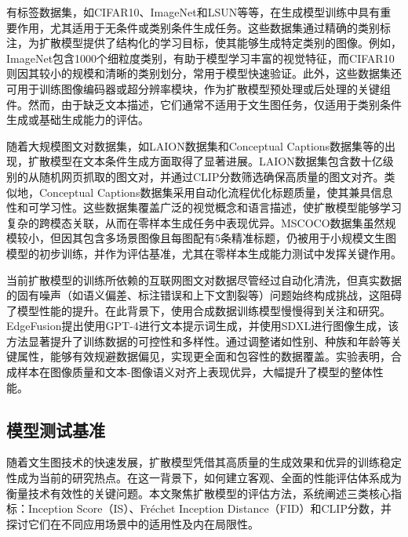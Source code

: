 \documentclass[11pt,a4paper,UTF8]{ctexart}
\begin{document}
有标签数据集，如CIFAR10\cite{krizhevsky2009learning}、ImageNet\cite{deng2009imagenet}和LSUN\cite{yu2015lsun}等等，在生成模型训练中具有重要作用，尤其适用于无条件或类别条件生成任务。这些数据集通过精确的类别标注，为扩散模型提供了结构化的学习目标，使其能够生成特定类别的图像。例如，ImageNet包含1000个细粒度类别，有助于模型学习丰富的视觉特征，而CIFAR10则因其较小的规模和清晰的类别划分，常用于模型快速验证。此外，这些数据集还可用于训练图像编码器或超分辨率模块\cite{rombach2022high}，作为扩散模型预处理或后处理的关键组件。然而，由于缺乏文本描述，它们通常不适用于文生图任务，仅适用于类别条件生成或基础生成能力的评估。

随着大规模图文对数据集，如LAION数据集\cite{schuhmann2021laion}和Conceptual Captions数据集\cite{sharma2018conceptual,changpinyo2021conceptual}等的出现，扩散模型在文本条件生成方面取得了显著进展。LAION数据集包含数十亿级别的从随机网页抓取的图文对，并通过CLIP分数筛选确保高质量的图文对齐。类似地，Conceptual Captions数据集采用自动化流程优化标题质量，使其兼具信息性和可学习性。这些数据集覆盖广泛的视觉概念和语言描述，使扩散模型能够学习复杂的跨模态关联，从而在零样本生成任务中表现优异。MSCOCO数据集\cite{lin2014microsoft}虽然规模较小，但因其包含多场景图像且每图配有5条精准标题，仍被用于小规模文生图模型的初步训练，并作为评估基准，尤其在零样本生成能力测试中发挥关键作用。

当前扩散模型的训练所依赖的互联网图文对数据尽管经过自动化清洗，但真实数据的固有噪声（如语义偏差、标注错误和上下文割裂等）问题始终构成挑战，这阻碍了模型性能的提升。在此背景下，使用合成数据训练模型慢慢得到关注和研究。EdgeFusion\cite{castells2024edgefusion}提出使用GPT-4进行文本提示词生成，并使用SDXL\cite{podell2023sdxl}进行图像生成，该方法显著提升了训练数据的可控性和多样性。通过调整诸如性别、种族和年龄等关键属性，能够有效规避数据偏见，实现更全面和包容性的数据覆盖。实验表明，合成样本在图像质量和文本-图像语义对齐上表现优异，大幅提升了模型的整体性能。


\subsection{模型测试基准}

随着文生图技术的快速发展，扩散模型凭借其高质量的生成效果和优异的训练稳定性成为当前的研究热点。在这一背景下，如何建立客观、全面的性能评估体系成为衡量技术有效性的关键问题。本文聚焦扩散模型的评估方法，系统阐述三类核心指标：Inception Score（IS）\cite{salimans2016improved}、Fr\'echet Inception Distance（FID）\cite{dowson1982frechet}和CLIP分数，并探讨它们在不同应用场景中的适用性及内在局限性。
\end{document}
